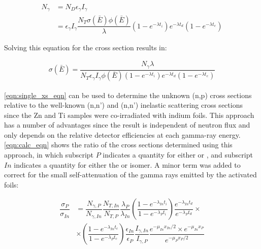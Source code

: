 \documentclass[5p]{elsarticle}
\newcommand{\pp}[1]{\left( #1\right)}
\begin{document}
 

\begin{align}
N_{\gamma} &= N_D \epsilon_\gamma I_\gamma \\
&=  \epsilon_\gamma I_\gamma  \dfrac{N_T \sigma\pp{\bar{E}} \phi\pp{\bar{E}} }{\lambda}\pp{1 - e^{-\lambda t_i}}  e^{-\lambda t_d} \pp{1 - e^{-\lambda t_c}} \nonumber
\end{align}

Solving this equation for the  cross section results in:

\begin{align}\label{eqn:single_xs_eqn}
\sigma\pp{\bar{E}} = \dfrac{N_{\gamma}\lambda}{N_T \epsilon_\gamma I_\gamma  \phi\pp{\bar{E}}  \pp{1 - e^{-\lambda t_i}} e^{-\lambda t_d} \pp{1 - e^{-\lambda t_c}}}
\end{align}


\autoref{eqn:single_xs_eqn} can be used to determine the unknown (n,p) cross sections relative to the well-known (n,n') and (n,n') inelastic scattering cross sections since the Zn and Ti samples were co-irradiated with indium foils.
This approach has a number of advantages since the result is independent of neutron flux and only depends on the relative detector efficiencies at each gamma-ray energy.
 \autoref{eqn:calc_eqn} shows the ratio of the cross sections determined using this approach, in which subscript $P$ indicates a quantity for either  or , and subscript $In$ indicates a quantity for either the  or  isomer.
A minor term was added to correct for the small self-attenuation of the gamma rays emitted by the activated foils:



\begin{align}\label{eqn:calc_eqn}
\dfrac{\sigma_P}{\sigma_{In}} &=  \dfrac{N_{\gamma,P}}{N_{\gamma,In}}  \dfrac{N_{T,In}}{N_{T,P}} \dfrac{\lambda_P}{\lambda_{In}} \pp{\dfrac{1 - e^{-\lambda_{In}t_i}}{1 - e^{-\lambda_{P}t_i}}} \dfrac{e^{-\lambda_{In}t_d}}{ e^{-\lambda_{P}t_d}} \times \\
&\times \pp{\dfrac{1 - e^{-\lambda_{In}t_c}}{1 - e^{-\lambda_{P}t_c}}} \dfrac{\epsilon_{In}}{\epsilon_P}  \dfrac{I_{\gamma,In}}{I_{\gamma,P}} \dfrac{e^{-\mu_{In}x_{In}/2}\times e^{-\mu_{In}x_{P}}}{e^{-\mu_{P}x_{P}/2}} \nonumber
\end{align}
\end{document}
